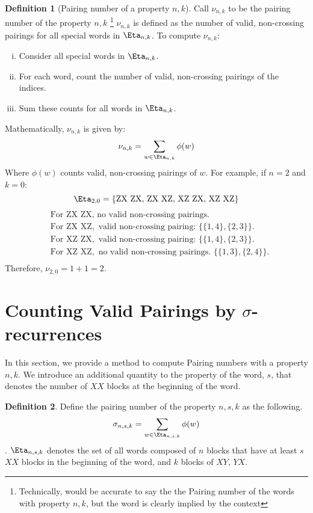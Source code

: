 \documentclass[12pt,reqno]{amsart}
\theoremstyle{plain} %
\theoremstyle{remark}
\theoremstyle{definition}
\newtheorem*{defn}{Definition}
\begin{document}
\begin{defn}[Pairing number of a property $n, k$]
    Call \(\nu_{n, k}\) to be the pairing number of the property $n, k$
    \footnote{Technically, would be accurate to say the the Pairing number 
    of the words with property $n, k$, but the word is clearly implied by the context}
\(\nu_{n, k}\) is defined as the number of valid, non-crossing pairings for all special words in \(\Eta_{n, k}\). To compute \(\nu_{n, k}\):

\begin{enumerate}[(i)]
    \item Consider all special words in \(\Eta_{n, k}\).
    \item For each word, count the number of valid, non-crossing pairings of the indices.
    \item Sum these counts for all words in \(\Eta_{n, k}\).
\end{enumerate}

Mathematically, \(\nu_{n, k}\) is given by:
\[
\nu_{n, k} = \sum_{w \in \Eta_{n, k}} \phi(w)
\]
Where $\phi(w)$ counts valid, non-crossing pairings of $w$. 
For example, if \(n = 2\) and \(k = 0\):
\[
\Eta_{2, 0} = \{\text{ZX ZX}, \, \text{ZX XZ}, \, \text{XZ ZX}, \, \text{XZ XZ}\}
\]
\[
\begin{aligned}
&\text{For } \text{ZX ZX}, \text{ no valid non-crossing pairings.} \\
&\text{For } \text{ZX XZ}, \text{ valid non-crossing pairing: } \{\{1, 4\}, \{2, 3\}\}. \\
&\text{For } \text{XZ ZX}, \text{ valid non-crossing pairing: } \{\{1, 4\}, \{2, 3\}\}. \\
&\text{For } \text{XZ XZ}, \text{ no valid non-crossing pairings. } \{\{1, 3\}, \{2, 4\}\}. \\
\end{aligned}
\]
Therefore, \(\nu_{2, 0} = 1 + 1 = 2\).
\end{defn}


\section{Counting Valid Pairings by $\sigma$-recurrences}

In this section, we provide a method to compute Pairing numbers 
with a property $n, k$. We introduce an additional quantity to the property 
of the word, $s$, that denotes the number of $XX$ blocks at the beginning 
of the word. 

\begin{defn}
    Define the pairing number of the property $n, s, k$ as the following. 
    \[
\sigma_{n, s, k} = \sum_{w \in \Eta_{n, s, k}} \phi(w)
\]. 
$\Eta_{n, s, k}$ denotes the set of all words composed of $n$ blocks that have at least
$s$ $XX$ blocks in the beginning of the word, and $k$ blocks of $XY$, $YX$. 
\end{defn}
\end{document}
